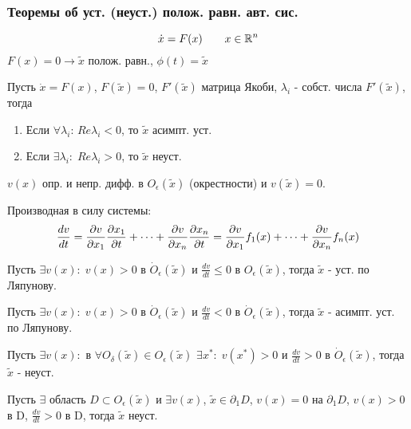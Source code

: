 \documentclass{article}
\begin{document}
\subsubsection{Теоремы об уст. (неуст.) полож. равн. авт. сис.}
\[
  \dot{x}=F(x) \qquad x \in \mathbb{R}^{n}
\]
$F(x)=0 \rightarrow\tilde{x}$ полож. равн., $\phi(t)=\tilde{x}$
\begin{theorem}
  Пусть $\dot{x}=F(x)$, $F(\tilde{x})=0$, $F'(\tilde{x})$ матрица Якоби,
  $\lambda_i$ - собст. числа $F'(\tilde{x})$, тогда
  \begin{enumerate}
    \item Если $\forall \lambda_i: \, Re \lambda_i < 0$, то $\tilde{x}$ асимпт. уст.
    \item Если $\exists \lambda_i: \; Re \lambda_i>0$, то $\tilde{x}$ неуст.
  \end{enumerate}
\end{theorem}
\begin{definition}
  $v(x)$ опр. и непр. дифф. в $O_{\epsilon}(\tilde{x})$ (окрестности)
  и $v(\tilde{x})=0$.

  Производная в силу системы:
  \[
    \frac{dv}{dt}=\frac{\partial{v}}{\partial{x_1}}\frac{\partial{x_1}}{\partial{t}}+\dots +\frac{\partial{v}}{\partial{x_n}}\frac{\partial{x_n}}{\partial{t}}=\frac{\partial{v}}{\partial{x_1}}f_1(x)+\dots +\frac{\partial{v}}{\partial{x_n}}f_n(x)
  \]
\end{definition}
\begin{theorem}
  Пусть $\exists v(x): \; v(x)>0$ в $\dot{O}_\epsilon(\tilde{x})$
  и $\frac{dv}{dt}\le 0$ в $O_{\epsilon}(\tilde{x})$,
  тогда $\tilde{x}$ - уст. по Ляпунову.
\end{theorem}
\begin{theorem}
  Пусть $\exists v(x): \; v(x)>0$ в $\dot{O}_\epsilon(\tilde{x})$
  и $\frac{dv}{dt}< 0$ в $\dot{O}_{\epsilon}(\tilde{x})$,
  тогда $\tilde{x}$ - асимпт. уст. по Ляпунову.
\end{theorem}
\begin{theorem}
  Пусть $\exists v(x):$ в $\forall O_\delta(\tilde{x})\in O_\epsilon(\tilde{x})$
  $\exists x^{*}: \; v(x^{*})>0$ и $\frac{dv}{dt}>0$ в $\dot{O}_\epsilon(\tilde{x})$,
  тогда $\tilde{x}$ - неуст.
\end{theorem}
\begin{theorem}
  \phantom{.}

  Пусть $\exists$ область $D\subset O_\epsilon(\tilde{x})$ и $\exists v(x)$,
  $\tilde{x}\in \partial_1 D$, $v(x)=0$ на $\partial_1 D$,
  $v(x)>0$ в D, $\frac{dv}{dt}>0$ в D,
  тогда $\tilde{x}$ неуст.
\end{theorem}
\end{document}
